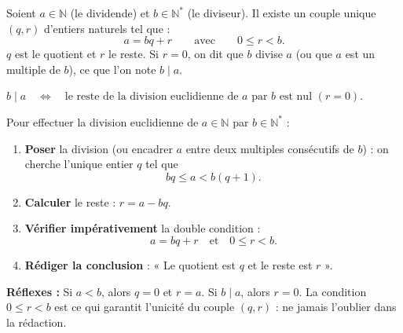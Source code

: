 \documentclass[11pt]{article}
\newcommand{\cle}[1]{{\popxbold\color{popdark}#1}}
\begin{document}
\begin{definition}
Soient $a \in \mathbb{N}$ (le \cle{dividende}) et $b \in \mathbb{N}^{*}$ (le \cle{diviseur}). Il existe un \cle{couple unique} $(q, r)$ d'entiers naturels tel que :
\[ a = bq + r \qquad \text{avec} \qquad 0 \leq r < b. \]
$q$ est le \cle{quotient} et $r$ le \cle{reste}.
Si $r = 0$, on dit que $b$ \cle{divise} $a$ (ou que $a$ est un \cle{multiple} de $b$), ce que l'on note $b \mid a$.
\end{definition}

\begin{propriete}
$b \mid a \quad \Longleftrightarrow \quad \text{le reste de la division euclidienne de } a \text{ par } b \text{ est nul } (r=0)$.
\end{propriete}

\begin{methode}
Pour effectuer la division euclidienne de $a \in \mathbb{N}$ par $b \in \mathbb{N}^{*}$ :
\begin{enumerate}
\item \textbf{Poser} la division (ou encadrer $a$ entre deux multiples consécutifs de $b$) : on cherche l'unique entier $q$ tel que
\[ bq \leq a < b(q+1). \]
\item \textbf{Calculer} le reste : $r = a - bq$.
\item \textbf{Vérifier impérativement} la double condition :
\[ a = bq + r \quad \text{et} \quad 0 \leq r < b. \]
\item \textbf{Rédiger la conclusion} : « Le quotient est $q$ et le reste est $r$ ».
\end{enumerate}
\textbf{Réflexes :} Si $a < b$, alors $q = 0$ et $r = a$. Si $b \mid a$, alors $r = 0$. La condition $0 \leq r < b$ est ce qui garantit l'\cle{unicité} du couple $(q, r)$ : ne jamais l'oublier dans la rédaction.
\end{methode}
\end{document}
